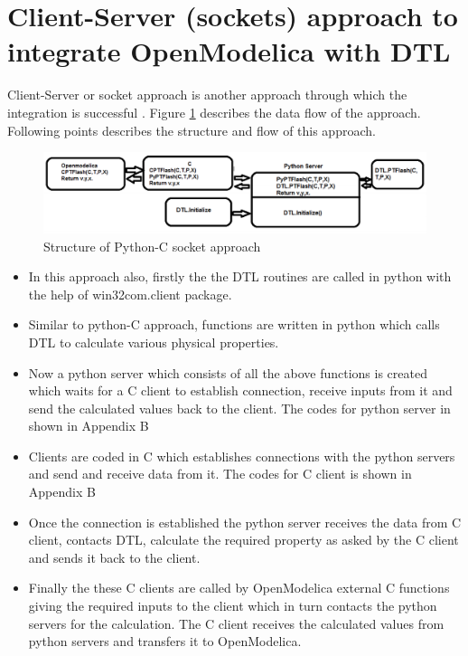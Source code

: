 \documentclass[12pt]{report}
\begin{document}
\section{Client-Server (sockets) approach to integrate OpenModelica with DTL}
Client-Server or socket approach \cite{socket} is another approach through which the integration is successful . Figure \ref{fig:PyC2} describes the data flow of the approach. Following points describes the structure and flow of this approach.

\begin{figure}
\centering
\includegraphics[width=1\linewidth]{PytC2}
\caption{Structure of Python-C socket approach}
\label{fig:PyC2}
\end{figure}

\begin{itemize}
\item{In this approach also, firstly the the DTL routines are called in python with the help of win32com.client package.}
\item{Similar to python-C approach, functions are written in python which calls DTL to calculate various physical properties.}
\item{Now a python server which consists of all the above functions is created which waits for a C client to establish connection, receive inputs from it and send the calculated values back to the client. The codes for python server in shown in Appendix B}
\item{Clients are coded in C which establishes connections with the python servers and send and receive data from it. The codes for C client is shown in Appendix B}
\item{Once the connection is established the python server receives the data from C client, contacts DTL, calculate the required property as asked by the C client and sends it back to the client.}
\item{Finally the these C clients are called by OpenModelica external C functions giving the required inputs to the client which in turn contacts the python servers for the calculation. The C client receives the calculated values from python servers and transfers it to OpenModelica.}
\end{itemize}
\end{document}
